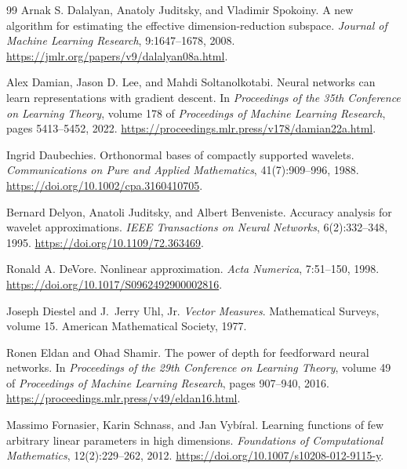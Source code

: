 \documentclass[11pt,twoside]{article}
\theoremstyle{definition}
\theoremstyle{remark}
\begin{document}
\begin{thebibliography}{99}
Arnak S. Dalalyan, Anatoly Juditsky, and Vladimir Spokoiny.
\newblock A new algorithm for estimating the effective dimension-reduction
subspace.
\newblock \emph{Journal of Machine Learning Research}, 9:1647--1678, 2008.
\newblock \url{https://jmlr.org/papers/v9/dalalyan08a.html}.

Alex Damian, Jason D. Lee, and Mahdi Soltanolkotabi.
\newblock Neural networks can learn representations with gradient descent.
\newblock In \emph{Proceedings of the 35th Conference on Learning Theory},
volume 178 of \emph{Proceedings of Machine Learning Research}, pages
5413--5452, 2022.
\newblock \url{https://proceedings.mlr.press/v178/damian22a.html}.

Ingrid Daubechies.
\newblock Orthonormal bases of compactly supported wavelets.
\newblock \emph{Communications on Pure and Applied Mathematics},
41(7):909--996, 1988.
\newblock \url{https://doi.org/10.1002/cpa.3160410705}.

Bernard Delyon, Anatoli Juditsky, and Albert Benveniste.
\newblock Accuracy analysis for wavelet approximations.
\newblock \emph{IEEE Transactions on Neural Networks}, 6(2):332--348, 1995.
\newblock \url{https://doi.org/10.1109/72.363469}.

Ronald A. DeVore.
\newblock Nonlinear approximation.
\newblock \emph{Acta Numerica}, 7:51--150, 1998.
\newblock \url{https://doi.org/10.1017/S0962492900002816}.

Joseph Diestel and J.~Jerry Uhl, Jr.
\newblock \emph{Vector Measures}.
\newblock Mathematical Surveys, volume 15. American Mathematical Society,
1977.

Ronen Eldan and Ohad Shamir.
\newblock The power of depth for feedforward neural networks.
\newblock In \emph{Proceedings of the 29th Conference on Learning Theory},
volume 49 of \emph{Proceedings of Machine Learning Research}, pages
907--940, 2016.
\newblock \url{https://proceedings.mlr.press/v49/eldan16.html}.

Massimo Fornasier, Karin Schnass, and Jan Vyb\'iral.
\newblock Learning functions of few arbitrary linear parameters in high
dimensions.
\newblock \emph{Foundations of Computational Mathematics}, 12(2):229--262,
2012.
\newblock \url{https://doi.org/10.1007/s10208-012-9115-y}.


\end{thebibliography}
\end{document}
